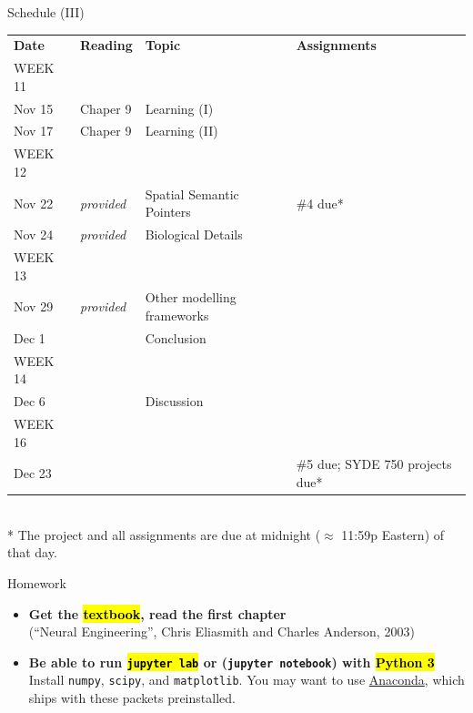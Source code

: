 \documentclass[aspectratio=169]{beamer}
\begin{document}
\begin{frame}{Schedule (III)}
	\small
	\begin{tabular}{p{2cm} p{2cm} p{5cm} p{3cm}}
		\toprule
		\textbf{Date} &	\textbf{Reading} &	\textbf{Topic} & \textbf{Assignments} \\
		\tiny WEEK 11 & & & \\
		Nov 15 &
		Chaper 9 &
		Learning (I) &
		\\
		Nov 17 &
		Chaper 9 &
		Learning (II) &
		\\[0.05cm]
		\tiny WEEK 12 & & & \\
		Nov 22 &
		\emph{provided} &
		Spatial Semantic Pointers &
		\#4 due*\\
		Nov 24 &
		\emph{provided} &
		Biological Details &
		\\[0.05cm]
		
		\tiny WEEK 13 & & & \\
		Nov 29 &
		\emph{provided} &
		Other modelling frameworks &
		\\
		Dec 1 &
		&
		Conclusion &
		\\[0.05cm]
		
		\tiny WEEK 14 & & & \\
		Dec 6 &
		&
		Discussion &
		\\[0.05cm]
		
		\tiny WEEK 16 & & & \\
		Dec 23 &
		&
		&
		\#5 due; SYDE 750 projects due* \\
		\bottomrule
	\end{tabular}\\[0.2cm]
	\footnotesize
	* The project and all assignments are due at midnight ($\approx$ 11:59p Eastern) of that day.
\end{frame}

\begin{frame}{Homework}
	\begin{itemize}
		\setlength{\itemsep}{0.5cm}
		\item \textbf{Get the \hl{textbook}, read the first chapter}\\
		(\enquote{Neural Engineering}, Chris Eliasmith and Charles Anderson, 2003)
		\item \textbf{Be able to run \hl{\texttt{jupyter lab}} or (\texttt{jupyter notebook}) with \hl{Python 3}}\\
		Install \texttt{numpy}, \texttt{scipy}, and \texttt{matplotlib}. You may want to use \href{https://www.anaconda.com/distribution/}{Anaconda}, which ships with these packets preinstalled.
	\end{itemize}
\end{frame}
\end{document}
